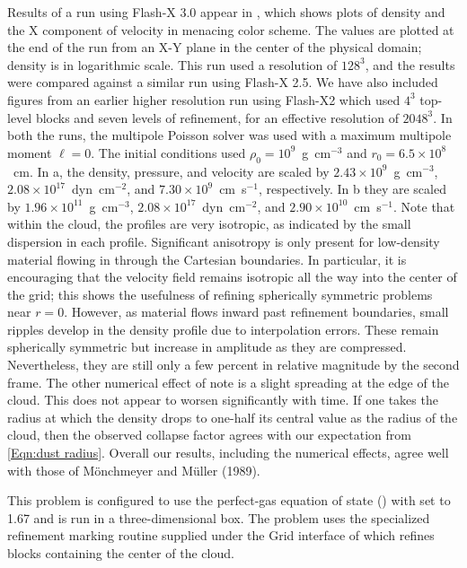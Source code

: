 Results of a  run using Flash-X 3.0 appear in
, which shows plots of density and the X
component of velocity in menacing color scheme. The values are plotted
at the end of the run from an X-Y plane in the center of the physical
domain; density is in logarithmic scale. This run used a resolution of
$128^3$, and the results were compared against a similar run using
Flash-X 2.5.  We have also included figures from an earlier higher
resolution run using Flash-X2 which used $4^3$ top-level blocks and
seven levels of refinement, for an effective resolution of $2048^3$.
In both the runs, the multipole Poisson solver was used with a maximum
multipole moment $\ell=0$. The initial conditions used $\rho_0 =
10^9$~g~cm$^{-3}$ and $r_0 = 6.5\times10^8$~cm. In a, the density, pressure, and velocity are scaled by
$2.43\times10^9$~g~cm$^{-3}$, $2.08\times10^{17}$~dyn~cm$^{-2}$, and
$7.30\times10^9$~cm~s$^{-1}$, respectively. In b they are scaled by $1.96\times10^{11}$~g~cm$^{-3}$,
$2.08\times10^{17}$~dyn~cm$^{-2}$, and
$2.90\times10^{10}$~cm~s$^{-1}$. Note that within the cloud, the
profiles are very isotropic, as indicated by the small dispersion in
each profile. Significant anisotropy is only present for low-density
material flowing in through the Cartesian boundaries. In particular,
it is encouraging that the velocity field remains isotropic all the
way into the center of the grid; this shows the usefulness of
refining spherically symmetric problems near $r=0$. However, as
material flows inward past refinement boundaries, small ripples
develop in the density profile due to interpolation errors. These
remain spherically symmetric but increase in amplitude as they are
compressed. Nevertheless, they are still only a few percent in
relative magnitude by the second frame.  The other numerical effect
of note is a slight spreading at the edge of the cloud.  This does
not appear to worsen significantly with time. If one takes the
radius at which the density drops to one-half its central value as
the radius of the cloud, then the observed collapse factor agrees
with our expectation from \eqref{Eqn:dust radius}. Overall our
results, including the numerical effects, agree well with those of
M\"onchmeyer and M\"uller (1989).

This problem is configured to use the perfect-gas
equation of state () with  set to 1.67 and
is run in a three-dimensional box.  The problem uses the specialized
refinement marking routine supplied under the Grid interface of
 which refines blocks
containing the center of the cloud.

